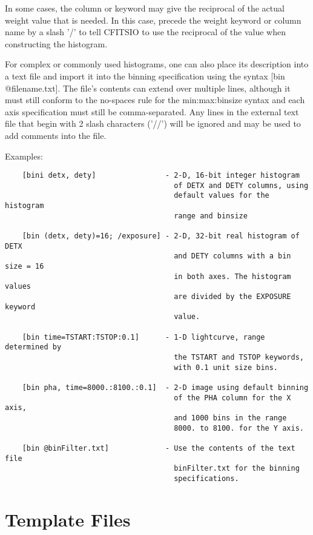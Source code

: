 \documentclass[11pt]{book}
\begin{document}
In some cases, the column or keyword may give the reciprocal of the
actual weight value that is needed.  In this case, precede the weight
keyword or column name by a slash '/' to tell CFITSIO to use the
reciprocal of the value when constructing the histogram.

For  complex or commonly  used  histograms, one  can also  place its
description  into  a  text  file and  import   it  into  the binning
specification  using the  syntax [bin  @filename.txt].  The file's
contents  can extend over   multiple lines, although  it must still
conform to the  no-spaces rule  for the min:max:binsize syntax and each
axis specification must still be comma-separated.  Any lines in the
external text file that begin with 2 slash characters ('//') will be
ignored and may be used to add comments into the file.

 Examples:


\begin{verbatim}
    [bini detx, dety]                - 2-D, 16-bit integer histogram
                                       of DETX and DETY columns, using
                                       default values for the histogram
                                       range and binsize

    [bin (detx, dety)=16; /exposure] - 2-D, 32-bit real histogram of DETX
                                       and DETY columns with a bin size = 16
                                       in both axes. The histogram values
                                       are divided by the EXPOSURE keyword
                                       value.

    [bin time=TSTART:TSTOP:0.1]      - 1-D lightcurve, range determined by
                                       the TSTART and TSTOP keywords,
                                       with 0.1 unit size bins.

    [bin pha, time=8000.:8100.:0.1]  - 2-D image using default binning
                                       of the PHA column for the X axis,
                                       and 1000 bins in the range
                                       8000. to 8100. for the Y axis.

    [bin @binFilter.txt]             - Use the contents of the text file
                                       binFilter.txt for the binning
                                       specifications.

\end{verbatim}
\chapter{Template Files }
\end{document}
